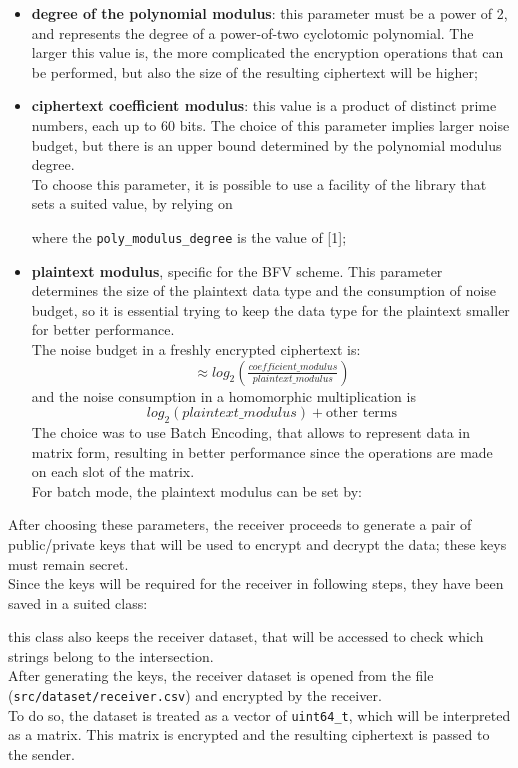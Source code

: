 \documentclass[10pt]{extarticle}
\begin{document}
\begin{itemize}
	\item \textbf{degree of the polynomial modulus}: this parameter must be a power of 2, and represents the degree of a power-of-two cyclotomic polynomial. The larger this value is, the more complicated the encryption operations that can be performed, but also the size of the resulting ciphertext will be higher;
	\item \textbf{ciphertext coefficient modulus}: this value is a product of distinct prime numbers, each up to 60 bits. The choice of this parameter implies larger noise budget, but there is an upper bound determined by the polynomial modulus degree.\\
	To choose this parameter, it is possible to use a facility of the library that sets a suited value, by relying on 
		
	where the \texttt{poly\_modulus\_degree} is the value of [1];
	\item \textbf{plaintext modulus}, specific for the BFV scheme. This parameter determines the size of the plaintext data type and the consumption of noise budget, so it is essential trying to keep the data type for the plaintext smaller for better performance.\\The noise budget in a freshly encrypted ciphertext is:
	\begin{equation}
		\approx log_2(\tfrac{coefficient\_modulus}{plaintext\_modulus})
	\end{equation}
	and the noise consumption in a homomorphic multiplication is 
	\begin{equation}
		log_2(plaintext\_modulus) + \text{other terms}
	\end{equation}
	The choice was to use Batch Encoding, that allows to represent data in matrix form, resulting in better performance since the operations are made on each slot of the matrix.\\For batch mode, the plaintext modulus can be set by:
        
\end{itemize}
After choosing these parameters, the receiver proceeds to generate a pair of public/private keys that will be used to encrypt and decrypt the data; these keys must remain secret.\\
Since the keys will be required for the receiver in following steps, they have been saved in a suited class:
\newpage

this class also keeps the receiver dataset, that will be accessed to check which strings belong to the intersection.\\
After generating the keys, the receiver dataset is opened from the file (\texttt{src/dataset/receiver.csv}) and encrypted by the receiver.\\To do so, the dataset is treated as a vector of \texttt{uint64\_t}, which will be interpreted as a matrix. This matrix is encrypted and the resulting ciphertext is passed to the sender.
\end{document}
